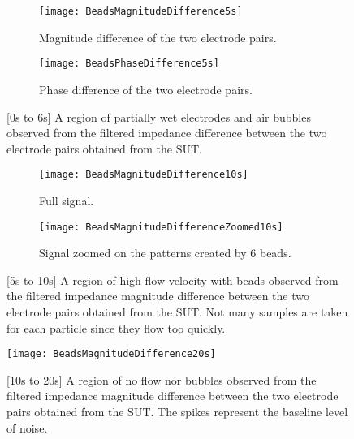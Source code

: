 \begin{figure}[h]
\centering
\begin{subfigure}{0.99\textwidth}
\centering
    \texttt{[image: BeadsMagnitudeDifference5s]}
    \caption{Magnitude difference of the two electrode pairs.}
    \label{fig:BeadsMagnitudeDifference5s}
\end{subfigure}
\begin{subfigure}{0.99\textwidth}
\centering
    \texttt{[image: BeadsPhaseDifference5s]}
    \caption{Phase difference of the two electrode pairs.}
    \label{fig:BeadsPhaseDifference5s}
\end{subfigure}
\caption{[0s to 6s] A region of partially wet electrodes and air bubbles observed from the filtered impedance difference between the two electrode pairs obtained from the SUT.}
\label{fig:BeadsImpedanceDifference5s}
\end{figure}

\begin{figure}[h]
\centering
\begin{subfigure}{0.99\textwidth}
\centering
    \texttt{[image: BeadsMagnitudeDifference10s]}
    \caption{Full signal.}
    \label{fig:BeadsMagnitudeDifference10s}
\end{subfigure}
\begin{subfigure}{0.99\textwidth}
\centering
    \texttt{[image: BeadsMagnitudeDifferenceZoomed10s]}
    \caption{Signal zoomed on the patterns created by 6 beads.}
    \label{fig:BeadsMagnitudeDifferenceZoomed10s}
\end{subfigure}
\caption{[5s to 10s] A region of high flow velocity with beads observed from the filtered impedance magnitude difference between the two electrode pairs obtained from the SUT. Not many samples are taken for each particle since they flow too quickly.}
\label{fig:BeadsImpedanceDifference10s}
\end{figure}

\begin{figure}[h]
\centering
\texttt{[image: BeadsMagnitudeDifference20s]}
\caption{[10s to 20s] A region of no flow nor bubbles observed from the filtered impedance magnitude difference between the two electrode pairs obtained from the SUT. The spikes represent the baseline level of noise.}
\label{fig:BeadsImpedanceDifference20s}
\end{figure}

